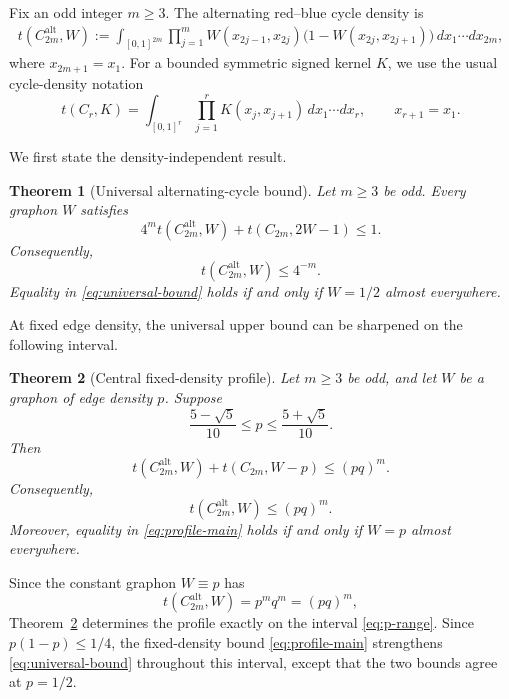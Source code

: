 \documentclass[11pt]{article}
\newtheorem{theorem}{Theorem}[section]
\newcommand{\Alt}{\mathrm{alt}}
\begin{document}
Fix an odd integer $m\ge3$.  The alternating red--blue cycle density is
\begin{align}
 t(C_{2m}^{\Alt},W)
 :=\int_{[0,1]^{2m}}
 \prod_{j=1}^{m}
   W(x_{2j-1},x_{2j})
   \bigl(1-W(x_{2j},x_{2j+1})\bigr)
 \,dx_1\cdots dx_{2m},
 \label{eq:alt-density}
\end{align}
where $x_{2m+1}=x_1$.
For a bounded symmetric signed kernel $K$, we use the usual cycle-density notation
\[
   t(C_r,K)
   =\int_{[0,1]^r}\prod_{j=1}^r K(x_j,x_{j+1})\,dx_1\cdots dx_r,
   \qquad x_{r+1}=x_1.
\]

We first state the density-independent result.

\begin{theorem}[Universal alternating-cycle bound]\label{thm:universal}
Let $m\ge3$ be odd.  Every graphon $W$ satisfies
\begin{equation}
   4^m t(C_{2m}^{\Alt},W)+t(C_{2m},2W-1)\le1.
   \label{eq:universal-strong}
\end{equation}
Consequently,
\begin{equation}
   t(C_{2m}^{\Alt},W)\le4^{-m}.
   \label{eq:universal-bound}
\end{equation}
Equality in \eqref{eq:universal-bound} holds if and only if $W=1/2$ almost everywhere.
\end{theorem}

At fixed edge density, the universal upper bound can be sharpened on the following interval.

\begin{theorem}[Central fixed-density profile]\label{thm:main}
Let $m\ge3$ be odd, and let $W$ be a graphon of edge density $p$.  Suppose
\begin{equation}
   \frac{5-\sqrt5}{10}\le p\le \frac{5+\sqrt5}{10}.
   \label{eq:p-range}
\end{equation}
Then
\begin{equation}
   t(C_{2m}^{\Alt},W)+t(C_{2m},W-p)
   \le (pq)^m.
   \label{eq:strong-main}
\end{equation}
Consequently,
\begin{equation}
   t(C_{2m}^{\Alt},W)\le(pq)^m.
   \label{eq:profile-main}
\end{equation}
Moreover, equality in \eqref{eq:profile-main} holds if and only if $W=p$ almost everywhere.
\end{theorem}

Since the constant graphon $W\equiv p$ has
\[
   t(C_{2m}^{\Alt},W)=p^mq^m=(pq)^m,
\]
Theorem~\ref{thm:main} determines the profile exactly on the interval \eqref{eq:p-range}.
Since $p(1-p)\le1/4$, the fixed-density bound \eqref{eq:profile-main} strengthens
\eqref{eq:universal-bound} throughout this interval, except that the two bounds agree at $p=1/2$.
\end{document}

